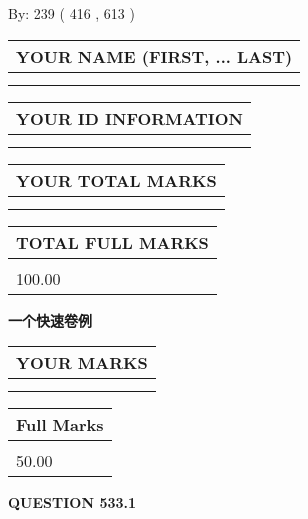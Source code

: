 \documentclass{ctexart}
\begin{document}
   
\hspace{1.0in} By: 
 239 ( 416 ,  613 )
   
   
   
   
\newpage 
\setcounter{page}{ 
   533001 } 
   
   
   
   
\noindent\begin{tabular}{|l|}
\hline
YOUR NAME (FIRST, ... LAST)  \\
\hline
 \\ 
 \\ 
\hline
\end{tabular}
\hspace{0.05in} \begin{tabular}{|l|}
\hline
 YOUR   ID   INFORMATION  \\
\hline
 \\ 
 \\ 
\hline
\end{tabular}
   
   
\vspace{0.2in}\noindent\begin{tabular}{|l|}
\hline
YOUR TOTAL MARKS  \\
\hline
 \\ 
 \\ 
\hline
\end{tabular}
\hspace{0.05in} \begin{tabular}{|l|}
\hline
TOTAL FULL MARKS  \\
\hline
 \\ 
100.00 \\
\hline
\end{tabular}
   
   
 \vspace{0.2in}
{\LARGE {\textbf{ 一个快速卷例}}}
   
   
  
\vspace{0.2in}
  
\noindent\begin{tabular}{|l|}
\hline
 YOUR MARKS  \\
\hline
 \\ 
 \\ 
\hline
\end{tabular}
\hspace{0.05in} \begin{tabular}{|l|}
\hline
 Full Marks  \\
\hline
 \\ 
50.00 \\
\hline
\end{tabular}
{\textbf{\Large{QUESTION
533.1 
}}}
  
\end{document}
